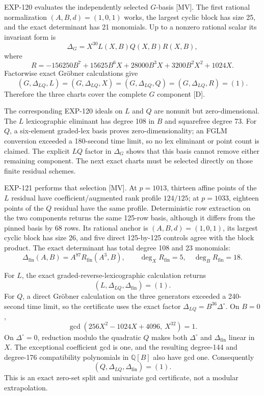 \documentclass[11pt]{article}
\theoremstyle{remark}
\newcommand{\Q}{\mathbb{Q}}
\begin{document}
EXP-120 evaluates the independently selected \(G\)-basis [MV]. The first
rational normalization \((A,B,d)=(1,0,1)\) works, the largest cyclic block
has size 25, and the exact determinant has 21 monomials. Up to a nonzero
rational scalar its invariant form is
\[
\Delta_G=X^{30}L(X,B)Q(X,B)R(X,B),
\]
where
\[
R=-156250B^7+15625B^6X+28000B^3X+3200B^2X^2+1024X.
\]
Factorwise exact Gr\"obner calculations give
\[
(G,\Delta_{LQ},L)=(G,\Delta_{LQ},X)
=(G,\Delta_{LQ},Q)=(G,\Delta_{LQ},R)=(1).
\]
Therefore the three charts cover the complete \(G\) component [D].

The corresponding EXP-120 ideals on \(L\) and \(Q\) are nonunit but
zero-dimensional. The \(L\) lexicographic eliminant has degree 108 in \(B\)
and squarefree degree 73. For \(Q\), a six-element graded-lex basis proves
zero-dimensionality; an FGLM conversion exceeded a 180-second time limit, so
no lex eliminant or point count is claimed. The explicit
\(LQ\) factor in \(\Delta_G\) shows that this basis cannot remove either
remaining component. The next exact charts must be selected directly on
those finite residual schemes.

EXP-121 performs that selection [MV]. At \(p=1013\), thirteen affine points
of the \(L\) residual have coefficient/augmented rank profile \(124/125\);
at \(p=1033\), eighteen points of the \(Q\) residual have the same profile.
Deterministic row extraction on the two components returns the same
125-row basis, although it differs from the pinned basis by 68 rows. Its
rational anchor is \((A,B,d)=(1,0,1)\), its largest cyclic block has size
26, and five direct 125-by-125 controls agree with the block product. The
exact determinant has total degree 108 and 23 monomials:
\[
 \Delta_{\mathrm{fin}}(A,B)=A^{87}R_{\mathrm{fin}}(A^3,B),
 \qquad
 \deg_XR_{\mathrm{fin}}=5,\quad
 \deg_BR_{\mathrm{fin}}=18.
\]

For \(L\), the exact graded-reverse-lexicographic calculation returns
\[
 (L,\Delta_{LQ},\Delta_{\mathrm{fin}})=(1).
\]
For \(Q\), a direct Gr\"obner calculation on the three generators exceeded a
240-second time limit, so the certificate uses the exact factor
\(\Delta_{LQ}=B^{36}\Delta^\circ\). On \(B=0\),
\[
 \gcd\!\left(256X^2-1024X+4096,\ X^{32}\right)=1.
\]
On \(\Delta^\circ=0\), reduction modulo the quadratic \(Q\) makes both
\(\Delta^\circ\) and \(\Delta_{\mathrm{fin}}\) linear in \(X\). The
exceptional coefficient gcd is one, and the resulting degree-144 and
degree-176 compatibility polynomials in \(\Q[B]\) also have gcd one.
Consequently
\[
 (Q,\Delta_{LQ},\Delta_{\mathrm{fin}})=(1).
\]
This is an exact zero-set split and univariate gcd certificate, not a
modular extrapolation.
\end{document}
